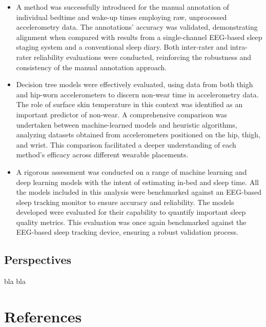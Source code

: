\documentclass[
  10pt,
]{scrbook}
\begin{document}
\begin{itemize}
\item
  A method was successfully introduced for the manual annotation of
  individual bedtime and wake-up times employing raw, unprocessed
  accelerometry data. The annotations' accuracy was validated,
  demonstrating alignment when compared with results from a
  single-channel EEG-based sleep staging system and a conventional sleep
  diary. Both inter-rater and intra-rater reliability evaluations were
  conducted, reinforcing the robustness and consistency of the manual
  annotation approach.
\item
  Decision tree models were effectively evaluated, using data from both
  thigh and hip-worn accelerometers to discern non-wear time in
  accelerometry data. The role of surface skin temperature in this
  context was identified as an important predictor of non-wear. A
  comprehensive comparison was undertaken between machine-learned models
  and heuristic algorithms, analyzing datasets obtained from
  accelerometers positioned on the hip, thigh, and wrist. This
  comparison facilitated a deeper understanding of each method's
  efficacy across different wearable placements.
\item
  A rigorous assessment was conducted on a range of machine learning and
  deep learning models with the intent of estimating in-bed and sleep
  time. All the models included in this analysis were benchmarked
  against an EEG-based sleep tracking monitor to ensure accuracy and
  reliability. The models developed were evaluated for their capability
  to quantify important sleep quality metrics. This evaluation was once
  again benchmarked against the EEG-based sleep tracking device,
  ensuring a robust validation process.
\end{itemize}

\hypertarget{perspectives}{%
\section{Perspectives}\label{perspectives}}

bla bla

\hypertarget{references}{%
\chapter{References}\label{references}}
\end{document}
